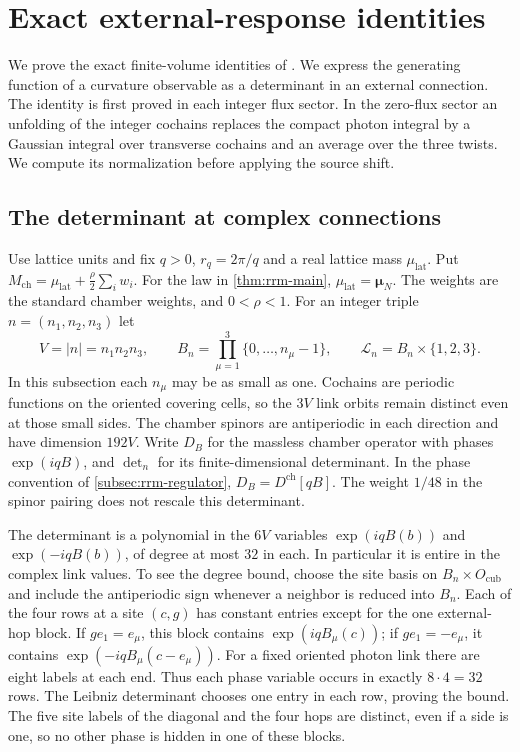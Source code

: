 \documentclass[11pt,letterpaper,reqno]{amsart}
\begin{document}
\section{Exact external-response identities}\label{sec:external-response}

We prove the exact finite-volume identities of
\cite[\S20]{QED3Master}. We express the generating function of a curvature observable as a
determinant in an external connection. The identity is first proved
in each integer flux sector. In the zero-flux sector an unfolding
of the integer cochains replaces the compact photon integral by a
Gaussian integral over transverse cochains and an average over the
three twists. We compute its normalization before applying the
source shift.

\subsection{The determinant at complex connections}
\label{subsec:external-complex-determinant}

Use lattice units and fix $q>0$, $r_q=2\pi/q$ and a real lattice
mass $\mu_{\mathrm{lat}}$. Put
$M_{\mathrm{ch}}=\mu_{\mathrm{lat}}+\frac{\rho}{2}\sum_iw_i$.
For the law in \cref{thm:rrm-main},
$\mu_{\mathrm{lat}}=\boldsymbol\mu_N$.
The weights are the standard chamber weights, and $0<\rho<1$.
For an integer triple $n=(n_1,n_2,n_3)$ let
\[
 V=|n|=n_1n_2n_3,\qquad
 B_n=\prod_{\mu=1}^3\{0,\ldots,n_\mu-1\},\qquad
 \mathcal L_n=B_n\times\{1,2,3\}.
\]
In this subsection each $n_\mu$ may be as small as one.
Cochains are periodic functions on the oriented covering cells,
so the $3V$ link orbits remain distinct even at those small sides.
The chamber spinors are antiperiodic in each direction and have
dimension $192V$. Write $D_B$ for the massless chamber operator
with phases $\exp(iqB)$, and $\det_n$ for its finite-dimensional
determinant. In the phase convention of
\cref{subsec:rrm-regulator}, $D_B=D^{\mathrm{ch}}[qB]$.
The weight $1/48$ in the spinor pairing does not rescale this
determinant.

The determinant is a polynomial in the $6V$ variables
$\exp(iqB(b))$ and $\exp(-iqB(b))$, of degree at most $32$
in each. In particular it is entire in the complex link values.
To see the degree bound, choose the site basis on
$B_n\times O_{\mathrm{cub}}$ and include the antiperiodic sign
whenever a neighbor is reduced into $B_n$. Each of the four
rows at a site $(c,g)$ has constant entries except for the
one external-hop block. If $ge_1=e_\mu$, this block contains
$\exp(iqB_\mu(c))$; if $ge_1=-e_\mu$, it contains
$\exp(-iqB_\mu(c-e_\mu))$. For a fixed oriented photon link
there are eight labels at each end. Thus each phase variable
occurs in exactly $8\cdot4=32$ rows. The Leibniz determinant
chooses one entry in each row, proving the bound. The five
site labels of the diagonal and the four hops are distinct,
even if a side is one, so no other phase is hidden in one
of these blocks.
\end{document}

